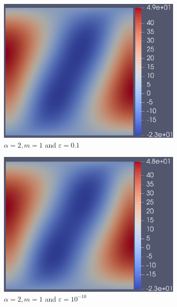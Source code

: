 \documentclass[12pt]{ociamthesis}
\begin{document}
\begin{figure}[H]
\begin{subfigure}{0.5\textwidth}
     \includegraphics[width=\textwidth]{Pics/uf/F_E1b_eps1.png}
     \caption{$\alpha=2, m=1$ and $\varepsilon = 0.1$}
 \end{subfigure}
 \begin{subfigure}{0.5\textwidth}
     \includegraphics[width=\textwidth]{Pics/uf/F_E1b_eps_10.png}
     \caption{$\alpha=2, m=1$ and $\varepsilon = 10^{-10}$}
 \end{subfigure}
 \begin{subfigure}{0.5\textwidth}

\end{subfigure}
\end{figure}
\end{document}
